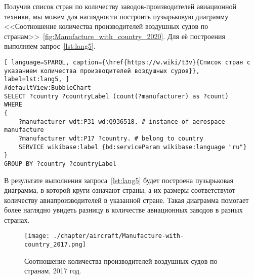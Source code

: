 
Получив список стран по количеству заводов-производителей авиационной техники, мы можем для наглядности построить пузырьковую диаграмму <<Соотношение количества
производителей воздушных судов по странам>>~\ref{fig:Manufacture_with_country_2020}. Для её построения выполняем запрос~\ref{lst:lang5}.

\begin{lstlisting}[ language=SPARQL, caption={\href{https://w.wiki/t3v}{Список стран с указанием количества производителей воздушных судов}}, label=lst:lang5, ]
#defaultView:BubbleChart
SELECT ?country ?countryLabel (count(?manufacturer) as ?count)
WHERE
{
    ?manufacturer wdt:P31 wd:Q936518. # instance of aerospace manufacture
  	?manufacturer wdt:P17 ?country. # belong to country
    SERVICE wikibase:label {bd:serviceParam wikibase:language "ru"}
}
GROUP BY ?country ?countryLabel
\end{lstlisting}

В результате выполнения запроса~\ref{lst:lang5} будет построена пузырьковая диаграмма, в которой круги означают страны, а их размеры соответствуют количеству авиапроизводителей в указанной стране. Такая диаграмма помогает более наглядно увидеть разницу в количестве авиационных заводов в разных странах.
 
\begin{figure}[h!]
\centering
	\texttt{[image: ./chapter/aircraft/Manufacture-with-country\_2017.png]}
	\caption{Соотношение количества производителей воздушных судов по странам, 2017 год.}
	\label{fig:Manufacture_with_country_2017}
\end{figure}

\label{aircraft_question_4}

